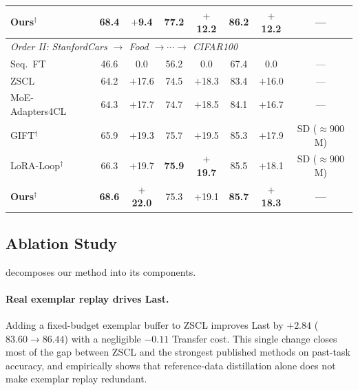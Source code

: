 \documentclass{article}
\newcommand{\dpos}[1]{\textcolor{blue!70!black}{#1}}
\begin{document}
\begin{table}[t]
\begin{tabular}{lccccccc}
  \midrule
  \rowcolor{gray!12}
  \textbf{Ours}$^\dagger$                       & 68.4 & \dpos{$+$9.4} & 77.2 & \dpos{$+$12.2} & \textbf{86.2} & \dpos{$+$\textbf{12.2}} & \textbf{---} \\
  \midrule
  \multicolumn{8}{l}{\textit{Order II: StanfordCars $\to$ Food $\to \cdots \to$ CIFAR100}} \\
  \midrule
  Seq.\ FT                                       & 46.6 & \phantom{$+$}0.0 & 56.2 & \phantom{$+$}0.0 & 67.4 & \phantom{$+$}0.0 & --- \\
  ZSCL~\citep{zheng2023zscl}                    & 64.2 & \dpos{$+$17.6} & 74.5 & \dpos{$+$18.3} & 83.4 & \dpos{$+$16.0} & --- \\
  MoE-Adapters4CL~\citep{yu2024moe}             & 64.3 & \dpos{$+$17.7} & 74.7 & \dpos{$+$18.5} & 84.1 & \dpos{$+$16.7} & --- \\
  GIFT$^\dagger$~\citep{gift2025}               & 65.9 & \dpos{$+$19.3} & 75.7 & \dpos{$+$19.5} & 85.3 & \dpos{$+$17.9} & SD (${\approx}900$M) \\
  LoRA-Loop$^\dagger$~\citep{loraloop2025}      & 66.3 & \dpos{$+$19.7} & \textbf{75.9} & \dpos{$+$\textbf{19.7}} & 85.5 & \dpos{$+$18.1} & SD (${\approx}900$M) \\
  \rowcolor{gray!12}
  \textbf{Ours}$^\dagger$                       & \textbf{68.6} & \dpos{$+$\textbf{22.0}} & 75.3 & \dpos{$+$19.1} & \textbf{85.7} & \dpos{$+$\textbf{18.3}} & \textbf{---} \\
  \bottomrule
  \end{tabular}
  \end{table}

    
  \subsection{Ablation Study}
  \label{sec:ablation}

   decomposes our method into its components.

  \paragraph{Real exemplar replay drives Last.}
  Adding a fixed-budget exemplar buffer to ZSCL improves Last by $+2.84$
  ($83.60 \to 86.44$) with a negligible $-0.11$ Transfer cost. This single change
  closes most of the gap between ZSCL and the strongest published methods on
  past-task accuracy, and empirically shows that reference-data distillation alone
  does not make exemplar replay redundant.
\end{document}
